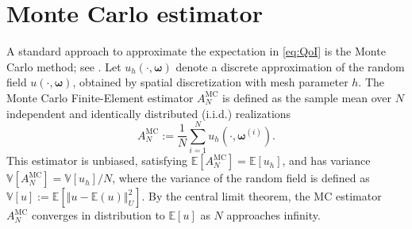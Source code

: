 \section{Monte Carlo estimator}\label{sec:MC}

A standard approach to approximate the expectation in \eqref{eq:QoI} is the Monte Carlo method; see \cite{ElLiSa:2023,Gi:2008,Gi:2015,PeWiGu:2016}. Let $u_h (\cdot, \boldsymbol{\omega})$ denote a discrete approximation of the random field $u(\cdot, \boldsymbol{\omega})$, obtained by spatial discretization with mesh parameter $h$. The Monte Carlo Finite-Element estimator $A^{\text{MC}}_{N}$ is defined as the sample mean over $N$ independent and identically distributed (i.i.d.) realizations 
%
\begin{equation}\label{eq:MC_estimator}
    A^{\text{MC}}_{N} := \frac{1}{N}\sum_{i=1}^{N} u_{h}\left(\cdot, \boldsymbol{\omega}^{(i)}\right).
\end{equation}
%
This estimator is unbiased, satisfying $\mathbb{E}[A^{\text{MC}}_{N}] = \mathbb{E}[u_{h}]$, and has variance $\mathbb{V}[A^{\text{MC}}_{N}] = \mathbb{V}[u_{h}]/{N}$, where the variance of the random field is defined as $\mathbb{V}[u] := \mathbb{E}[\left\Vert u - \mathbb{E}(u)\right\Vert_U^2]$. By the central limit theorem, the MC estimator $A^{\text{MC}}_{N}$ converges in distribution to $\mathbb{E}[u]$ as $N$ approaches infinity. 

